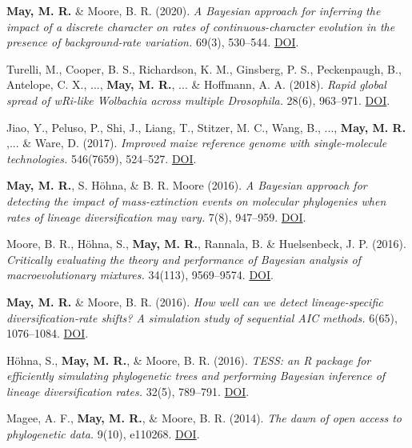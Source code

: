 \begin{etaremune}[topsep=0pt,itemsep=1.2em,partopsep=0pt,parsep=0pt]
    \item \textbf{May, M. R.} \& Moore, B. R. (2020). \textit{A Bayesian approach for inferring the impact of a discrete character on rates of continuous-character evolution in the presence of background-rate variation.}  69(3), 530–544. \href{https://doi.org/10.1093/sysbio/syz069}{DOI}.
    \item Turelli, M., Cooper, B. S., Richardson, K. M., Ginsberg, P. S., Peckenpaugh, B., Antelope, C. X., ..., \textbf{May, M. R.}, ... \& Hoffmann, A. A. (2018). \textit{Rapid global spread of wRi-like Wolbachia across multiple Drosophila.}  28(6), 963–971. \href{https://linkinghub.elsevier.com/retrieve/pii/S0960982218301696}{DOI}.
    \item Jiao, Y., Peluso, P., Shi, J., Liang, T., Stitzer, M. C., Wang, B., ..., \textbf{May, M. R.} ,... \& Ware, D. (2017). \textit{Improved maize reference genome with single-molecule technologies.}  546(7659), 524–527. \href{https://www.nature.com/articles/nature22971}{DOI}.
    \item \textbf{May, M. R.}, S. Höhna, \& B. R. Moore (2016). \textit{A Bayesian approach for detecting the impact of mass-extinction events on molecular phylogenies when rates of lineage diversification may vary.}  7(8), 947–959. \href{https://doi.org/10.1111/2041-210X.12563}{DOI}.
    \item Moore, B. R., Höhna, S., \textbf{May, M. R.}, Rannala, B. \& Huelsenbeck, J. P. (2016). \textit{Critically evaluating the theory and performance of Bayesian analysis of macroevolutionary mixtures.}  34(113), 9569–9574. \href{https://doi.org/10.1073/pnas.1518659113}{DOI}.
    \item \textbf{May, M. R.} \& Moore, B. R. (2016). \textit{How well can we detect lineage-specific diversification-rate shifts? A simulation study of sequential AIC methods.}  6(65), 1076–1084. \href{https://doi.org/10.1093/sysbio/syw026}{DOI}.
    \item Höhna, S., \textbf{May, M. R.}, \& Moore, B. R. (2016). \textit{TESS: an R package for efficiently simulating phylogenetic trees and performing Bayesian inference of lineage diversification rates.}  32(5), 789–791. \href{https://doi.org/10.1093/bioinformatics/btv651}{DOI}.
    \item Magee, A. F., \textbf{May, M. R.}, \& Moore, B. R. (2014). \textit{The dawn of open access to phylogenetic data.}  9(10), e110268. \href{https://journals.plos.org/plosone/article?id=10.1371/journal.pone.0110268}{DOI}.

\end{etaremune}
